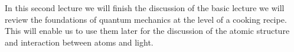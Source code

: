 In this second lecture we will finish the discussion of the basic  lecture we will review the foundations of quantum mechanics at the level of a cooking recipe. This will enable us to use them later for the discussion of the atomic structure and interaction between atoms and light.